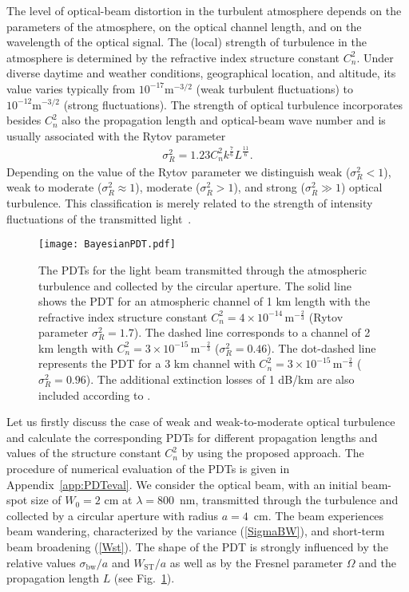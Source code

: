 \documentclass[aps,pra,twocolumn,a4paper,nofootinbib,preprintnumbers] {revtex4-1}
\begin{document}
	The level of optical-beam distortion  in the turbulent atmosphere depends on the parameters of the atmosphere, on the optical channel length, and on the  wavelength of the optical signal.
	The (local) strength of turbulence in the atmosphere is determined by the refractive index structure constant $C_n^2$.
	Under diverse daytime and weather conditions, geographical location, and altitude,  its value  varies typically from $10^{-17}\text{m}^{-3/2}$ (weak turbulent fluctuations) to $10^{-12}\text{m}^{-3/2}$ (strong fluctuations).
	The strength of optical turbulence  incorporates besides $C_n^2$ also the propagation length  and   optical-beam wave number and is usually associated with  the Rytov parameter
		\begin{align}\label{RytovSigma}
		\sigma_R^2 =1.23 C_n^2 k^{\frac{7}{6}}L^{\frac{11}{6}}.
		\end{align}
	Depending on the value of the Rytov parameter we distinguish weak ($\sigma_R^2< 1$), weak to moderate ($\sigma_R^2\approx 1$), moderate ($\sigma_R^2>1$), and strong ($\sigma_R^2\gg 1$) optical turbulence.
	This classification is merely related to the strength of intensity fluctuations of the transmitted light~\cite{Kravtsov}.

\begin{figure}[ht]
 \texttt{[image: BayesianPDT.pdf]}
 \caption{\label{fig:Bayes1}  The PDTs for the light beam  transmitted through the atmospheric turbulence and collected by the circular aperture.
 The solid line  shows the PDT for an atmospheric channel of  1 km length with the refractive index structure constant  $C_n^2{=}4{\times} 10^{-14}\,\text{m}^{-\frac{2}{3}}$ (Rytov parameter $\sigma_R^2{=}1.7$).
 The dashed line corresponds to a  channel of 2 km length with $C_n^2{=}3{\times} 10^{-15}\,\text{m}^{-\frac{2}{3}}$ ($\sigma_R^2{=}0.46$).
 The dot-dashed line  represents the PDT for a 3 km channel with $C_n^2{=}3{\times} 10^{-15}\,\text{m}^{-\frac{2}{3}}$ ($\sigma_R^2{=}0.96$).
 The additional  extinction losses of 1 dB/km are also included according to \cite{Elterman}.
}
\end{figure}

	 Let us firstly discuss  the case of weak  and weak-to-moderate  optical turbulence and calculate the corresponding  PDTs  for different propagation lengths and values of the structure constant $C_n^2$ by using the proposed approach.
	 The procedure of numerical evaluation of the PDTs is given in Appendix~\ref{app:PDTeval}.
	 We consider the optical beam, with an initial beam-spot size of $W_0{=}2$ cm at $\lambda{=}800$~nm, transmitted through the turbulence and collected by a  circular aperture with  radius $a{=}4$~cm.
	 The beam experiences beam wandering, characterized by the variance (\ref{SigmaBW}), and short-term beam broadening (\ref{Wst}).
	 The shape of the PDT is strongly influenced by the relative values $\sigma_{\mathrm{bw}}/a$ and   $W_{\mathrm{ST}}/a$  as well as by the Fresnel parameter $\Omega$ and the propagation length $L$ (see Fig.~\ref{fig:Bayes1}).
\end{document}
